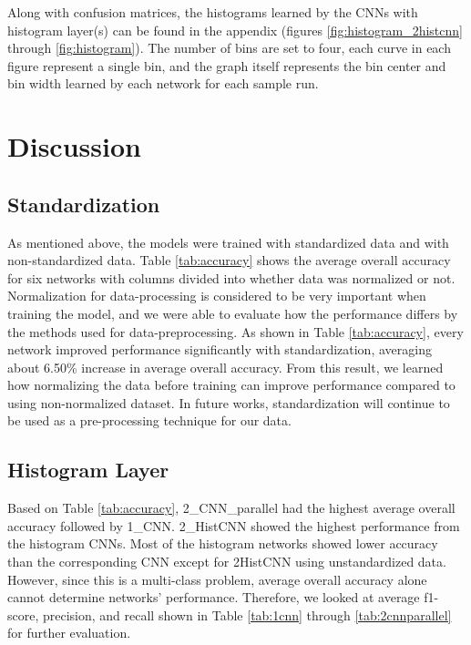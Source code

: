 \documentclass[10pt,twocolumn,letterpaper]{article}
\begin{document}
Along with confusion matrices, the histograms learned by the CNNs with histogram layer(s) can be found in the appendix (figures \ref{fig:histogram_2histcnn} through \ref{fig:histogram}). The number of bins are set to four, each curve in each figure represent a single bin, and the graph itself represents the bin center and bin width learned by each network for each sample run.

\section{Discussion}

\subsection{Standardization}

As mentioned above, the models were trained with standardized data and with non-standardized data. Table \ref{tab:accuracy} shows the average overall accuracy for six networks with columns divided into whether data was normalized or not. Normalization for data-processing is considered to be very important when training the model, and we were able to evaluate how the performance differs by the methods used for data-preprocessing.
As shown in Table \ref{tab:accuracy}, every network improved performance significantly with standardization, averaging about 6.50\% increase in average overall accuracy. From this result, we learned how normalizing the data before training can improve performance compared to using non-normalized dataset. In future works, standardization will continue to be used as a pre-processing technique for our data.


\subsection{Histogram Layer}

Based on Table \ref{tab:accuracy}, 2\_CNN\_parallel had the highest average overall accuracy followed by 1\_CNN. 2\_HistCNN showed the highest performance from the histogram CNNs.
Most of the histogram networks showed lower accuracy than the corresponding CNN except for 2HistCNN using unstandardized data.
However, since this is a multi-class problem, average overall accuracy alone cannot determine networks' performance. Therefore, we looked at average f1-score, precision, and recall shown in Table \ref{tab:1cnn} through \ref{tab:2cnnparallel} for further evaluation.\\
\end{document}

